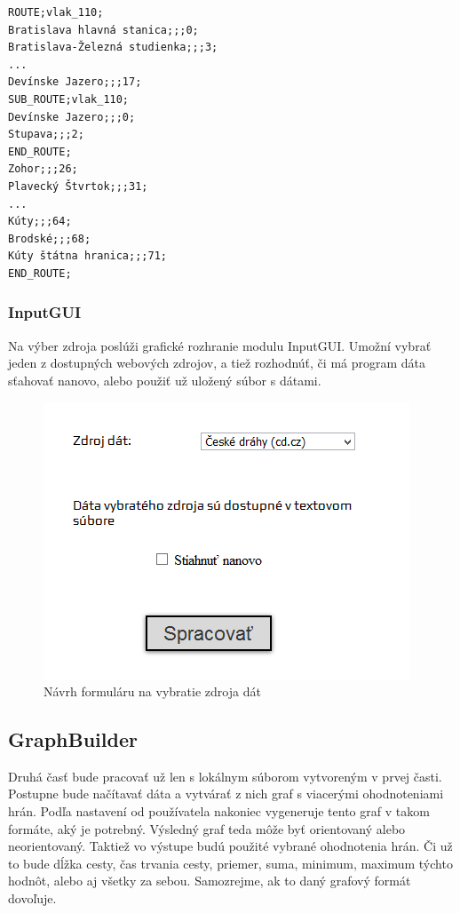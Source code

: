 \documentclass[12pt,twoside,slovak,a4paper]{article}
\begin{document}
	\small
		\begin{verbatim}
ROUTE;vlak_110;
Bratislava hlavná stanica;;;0;
Bratislava-Železná studienka;;;3;
...
Devínske Jazero;;;17;
SUB_ROUTE;vlak_110;
Devínske Jazero;;;0;
Stupava;;;2;
END_ROUTE;
Zohor;;;26;
Plavecký Štvrtok;;;31;
...
Kúty;;;64;
Brodské;;;68;
Kúty štátna hranica;;;71;
END_ROUTE;

\end{verbatim}
	\normalsize	
	
	\subsubsection{InputGUI}
	Na výber zdroja poslúži grafické rozhranie modulu InputGUI. Umožní vybrať jeden z dostupných webových zdrojov, a tiež rozhodnúť, či má program dáta sťahovať nanovo, alebo použiť už uložený súbor s dátami. 
	
	\begin{figure}[H]
	 \caption{Návrh formuláru na vybratie zdroja dát}
	 \includegraphics{gui_vyber_zdroja}
	 \end{figure}	
		
	\subsection{GraphBuilder}
	Druhá časť bude pracovať už len s lokálnym súborom vytvoreným v prvej časti. Postupne bude načítavať dáta a vytvárať z nich graf s viacerými ohodnoteniami hrán. Podľa nastavení od používatela nakoniec vygeneruje tento graf v takom formáte, aký je potrebný. Výsledný graf teda môže byť orientovaný alebo neorientovaný. Taktiež vo výstupe budú použité vybrané ohodnotenia hrán. Či už to bude dĺžka cesty, čas trvania cesty, priemer, suma, minimum, maximum týchto hodnôt, alebo aj všetky za sebou. Samozrejme, ak to daný grafový formát dovoľuje.
	
\end{document}
